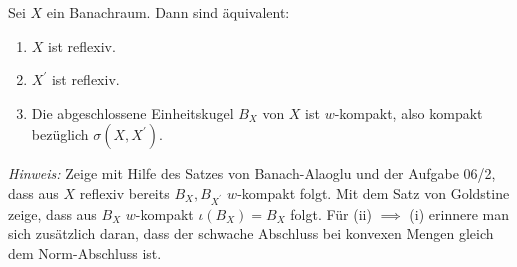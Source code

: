 \begin{exercise}

Sei $X$ ein Banachraum. Dann sind äquivalent:

\begin{enumerate}[label = \roman*)]

  \item
  $X$ ist reflexiv.

  \item
  $X^\prime$ ist reflexiv.

  \item
  Die abgeschlossene Einheitskugel $B_X$ von $X$ ist $w$-kompakt, also kompakt bezüglich $\sigma(X,X^\prime)$.

\end{enumerate}

\textit{Hinweis:}
Zeige mit Hilfe des Satzes von Banach-Alaoglu und der Aufgabe 06/2, dass aus $X$ reflexiv bereits $B_X, B_{X^\prime}$ $w$-kompakt folgt.
Mit dem Satz von Goldstine zeige, dass aus $B_X$ $w$-kompakt $\iota(B_X) = B_X$ folgt.
Für (ii) $\implies$ (i) erinnere man sich zusätzlich daran, dass der schwache Abschluss bei konvexen Mengen gleich dem Norm-Abschluss ist.

\end{exercise}

